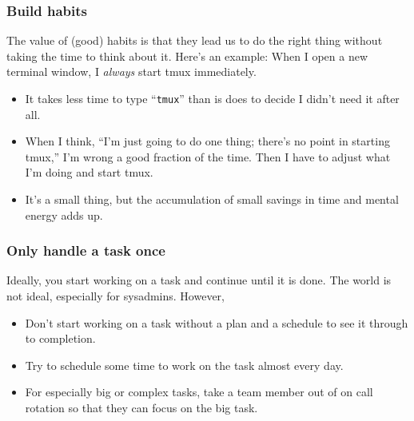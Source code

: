 \documentclass[10pt]{beamer}
\begin{document}
\begin{frame}
  \frametitle{Build habits}
  
    The value of (good) habits is that they lead us to do the right thing without 
    taking the time to think about it. Here's an example: When I open a new terminal 
    window, I \emph{always} start tmux immediately.
    
    \begin{itemize}
    \item It takes less time to type ``\texttt{tmux}'' than is does to decide 
    I didn't need it after all.
    \item When I think, ``I'm just going to do one thing; there's no point
    in starting tmux,'' I'm wrong a good fraction of the time. Then I have to 
    adjust what I'm doing and start tmux.
    \item It's a small thing, but the accumulation of small savings in time and mental 
    energy adds up.
    
    \end{itemize}
     
\end{frame}

\begin{frame}
  \frametitle{Only handle a task once}
  
   Ideally, you start working on a task and continue until it is done.
   The world is not ideal, especially for sysadmins. However,
   
   \begin{itemize}
     \item Don't start working on a task without a plan and a schedule
     to see it through to completion.
     \item Try to schedule some time to work on the task almost every day.
     \item For especially big or complex tasks, take a team member out of
     on call rotation so that they can focus on the big task.
   \end{itemize}
   
\end{frame}
\end{document}
